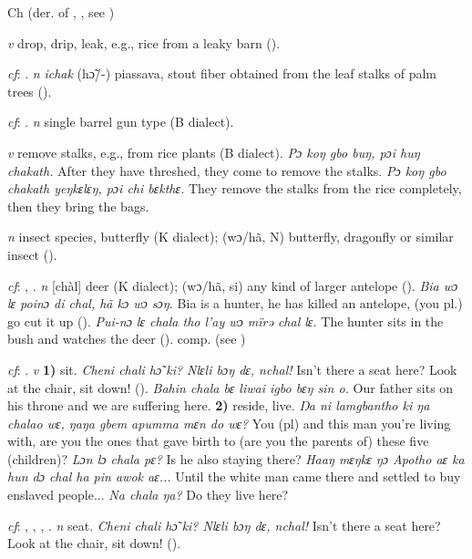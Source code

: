 \begin{letter}{Ch}
 (der. of , , see ) 

 \textit{v} drop, drip, leak, e.g., rice from a leaky barn (\citealt{Pichl1967}). 

 \textit{cf}: . \textit{n} \textit{ichak} (hɔ̃/-) piassava, stout fiber obtained from the leaf stalks of palm trees (\citealt{Pichl1967}). 

 \textit{cf}: . \textit{n} single barrel gun type (B dialect). 

 \textit{v} remove stalks, e.g., from rice plants (B dialect). \textit{Pɔ koŋ gbo buŋ, pɔi huŋ chakath.} After they have threshed, they come to remove the stalks. \textit{Pɔ koŋ gbo chakath yeŋkɛlɛŋ, pɔi chi bɛkthɛ.} They remove the stalks from the rice completely, then they bring the bags.

 \textit{n} insect species, butterfly (K dialect); (wɔ/hã, N) butterfly, dragonfly or similar insect (\citealt{Pichl1967}). 

 \textit{cf}: , . \textit{n} [chàl] deer (K dialect); (wɔ/hã, si) any kind of larger antelope (\citealt{Pichl1967}). \textit{Bia wɔ lɛ poinɔ di chal, hã kɔ wɔ sɔŋ.} Bia is a hunter, he has killed an antelope, (you pl.) go cut it up (\citealt{Pichl1967}). \textit{Pui-nɔ lɛ chala tho l'ay wɔ mïrə chal lɛ.} The hunter sits in the bush and watches the deer (\citealt{Pichl1967}). comp.  (see ) 

 \textit{cf}: . \textit{v} \textbf{1)} sit. \textit{Cheni chali hɔ̃ ki? Nlɛli bɔŋ dɛ, nchal!} Isn't there a seat here? Look at the chair, sit down! (\citealt{Pichl1967}). \textit{Bahin chala bɛ liwai igbo bɛŋ sin o.} Our father sits on his throne and we are suffering here. \textbf{2)} reside, live. \textit{Ŋa ni lamgbantho ki ŋa chalao wɛ, ŋaŋa gbem apumma mɛn do wɛ?} You (pl) and this man you're living with, are you the ones that gave birth to (are you the parents of) these five (children)? \textit{Lɔn lɔ chala pɛ?} Is he also staying there? \textit{Haaŋ mɛŋkɛ ŋɔ Apotho aɛ ka hun dɔ chal ha pin awok aɛ...} Until the white man came there and settled to buy enslaved people... \textit{Na chala ŋa?} Do they live here?

 \textit{cf}: , , , . \textit{n} seat. \textit{Cheni chali hɔ̃ ki? Nlɛli bɔŋ dɛ, nchal!} Isn't there a seat here? Look at the chair, sit down! (\citealt{Pichl1967}). 


\end{letter}
